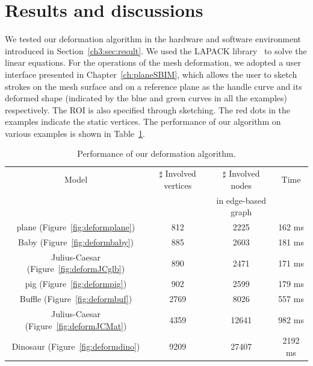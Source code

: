 \section{Results and discussions}
\label{ch5:sec:results}
We tested our deformation algorithm in the hardware and software
environment introduced in Section~\ref{ch3:sec:result}. We used the
LAPACK library~\cite{ABBD92} to solve the linear equations.
For the operations of the mesh deformation, we adopted a user
interface presented in Chapter~\ref{ch:planeSBIM}, which allows the
user to sketch strokes on the mesh surface and on a reference plane
as the handle curve and its deformed shape (indicated by the blue
and green curves in all the examples) respectively. The ROI is also
specified through sketching. The red dots in the examples indicate
the static vertices. The performance of our algorithm on various
examples is shown in Table~\ref{tb:DeformPerform}.

\begin{table}[htbp]
\caption{Performance of our deformation algorithm.}
\begin{center}
\begin{tabular}{|c|c|c|c|}
\hline
  Model    &$\sharp$ Involved vertices&$\sharp$ Involved nodes&Time\\
           & &in edge-based graph& \\

\hline plane (Figure~\ref{fig:deformplane})         &812&2225&162 ms\\
\hline Baby (Figure~\ref{fig:deformbaby})           &885&2603&181 ms\\
\hline Julius-Caesar (Figure~\ref{fig:deformJCglb}) &890&2471&171 ms\\
\hline pig (Figure~\ref{fig:deformpig})             &902&2599&179 ms\\
\hline Buffle (Figure~\ref{fig:deformbuf})          &2769&8026&557 ms\\
\hline Julius-Caesar (Figure~\ref{fig:deformJCMat}) &4359&12641&982 ms\\
\hline Dinosaur (Figure~\ref{fig:deformdino})       &9209&27407&2192 ms\\
\hline
\end{tabular}
\label{tb:DeformPerform} %
\end{center}
\end{table}

